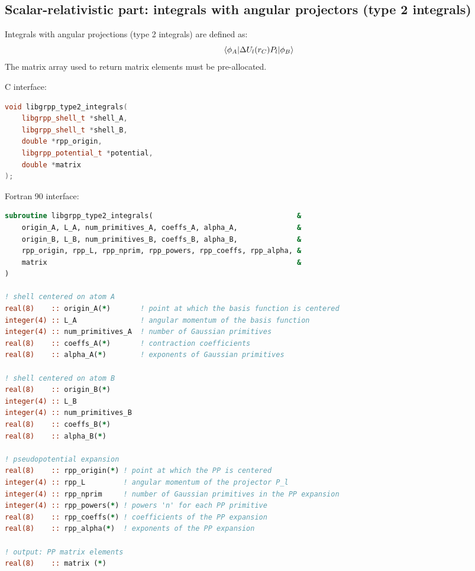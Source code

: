 \documentclass[12pt]{article}
\begin{document}
\subsection{Scalar-relativistic part: integrals with angular projectors (type 2 integrals)}

Integrals with angular projections (type 2 integrals) are defined as:
%
\begin{equation}
\braket{\phi_A|\Delta U_l(r_C) P_l|\phi_B}
\label{eq:def-type2-ints}
\end{equation}
%
The matrix array used to return matrix elements must be pre-allocated.

C interface:
%
\begin{lstlisting}[language=C++]
void libgrpp_type2_integrals(
    libgrpp_shell_t *shell_A,
    libgrpp_shell_t *shell_B,
    double *rpp_origin,
    libgrpp_potential_t *potential,
    double *matrix
);
\end{lstlisting}

Fortran 90 interface:
\begin{lstlisting}[language=Fortran]
subroutine libgrpp_type2_integrals(                                  &
    origin_A, L_A, num_primitives_A, coeffs_A, alpha_A,              &
    origin_B, L_B, num_primitives_B, coeffs_B, alpha_B,              &
    rpp_origin, rpp_L, rpp_nprim, rpp_powers, rpp_coeffs, rpp_alpha, &
    matrix                                                           &
)

! shell centered on atom A
real(8)    :: origin_A(*)       ! point at which the basis function is centered
integer(4) :: L_A               ! angular momentum of the basis function
integer(4) :: num_primitives_A  ! number of Gaussian primitives
real(8)    :: coeffs_A(*)       ! contraction coefficients
real(8)    :: alpha_A(*)        ! exponents of Gaussian primitives

! shell centered on atom B
real(8)    :: origin_B(*)
integer(4) :: L_B
integer(4) :: num_primitives_B
real(8)    :: coeffs_B(*)
real(8)    :: alpha_B(*)

! pseudopotential expansion
real(8)    :: rpp_origin(*) ! point at which the PP is centered
integer(4) :: rpp_L         ! angular momentum of the projector P_l
integer(4) :: rpp_nprim     ! number of Gaussian primitives in the PP expansion
integer(4) :: rpp_powers(*) ! powers 'n' for each PP primitive
real(8)    :: rpp_coeffs(*) ! coefficients of the PP expansion
real(8)    :: rpp_alpha(*)  ! exponents of the PP expansion

! output: PP matrix elements
real(8)    :: matrix (*)
\end{lstlisting}
\end{document}
